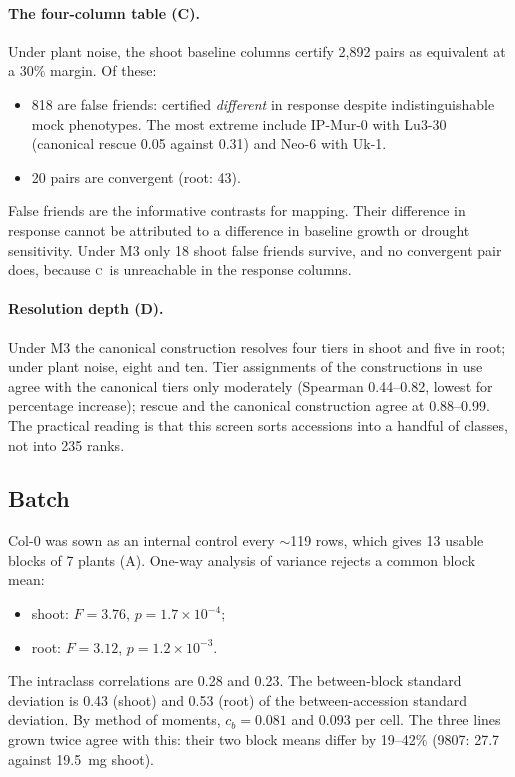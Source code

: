 \documentclass[10pt,twocolumn,a4paper]{article}
\theoremstyle{definition}
\theoremstyle{remark}
\newcommand{\CC}{\textsc{c}}
\begin{document}
\paragraph{The four-column table (C).} Under plant noise,
the shoot baseline columns certify 2,892 pairs as equivalent at a 30\%
margin. Of these:
\begin{itemize}[leftmargin=1.3em,itemsep=1pt]
  \item 818 are false friends: certified \emph{different} in response
  despite indistinguishable mock phenotypes. The most extreme include
  IP-Mur-0 with Lu3-30 (canonical rescue 0.05 against 0.31) and Neo-6
  with Uk-1.
  \item 20 pairs are convergent (root: 43).
\end{itemize}
False friends are the informative contrasts for mapping. Their
difference in response cannot be attributed to a difference in baseline
growth or drought sensitivity. Under M3 only 18 shoot false friends
survive, and no convergent pair does, because \CC\ is unreachable in the
response columns.

\paragraph{Resolution depth (D).} Under M3 the canonical
construction resolves four tiers in shoot and five in root; under plant
noise, eight and ten. Tier assignments of the constructions in use agree
with the canonical tiers only moderately (Spearman 0.44--0.82, lowest for
percentage increase); rescue and the canonical construction agree at
0.88--0.99. The practical reading is that this screen sorts
accessions into a handful of classes, not into 235 ranks.

\subsection{Batch}
\label{sec:res-batch}

Col-0 was sown as an internal control every $\sim$119 rows, which gives
13 usable blocks of 7 plants (A). One-way analysis of
variance rejects a common block mean:
\begin{itemize}[leftmargin=1.3em,itemsep=1pt]
  \item shoot: $F=3.76$, $p=1.7\times10^{-4}$;
  \item root: $F=3.12$, $p=1.2\times10^{-3}$.
\end{itemize}
The intraclass correlations \citep{shrout1979} are 0.28 and 0.23. The
between-block standard deviation is 0.43 (shoot) and 0.53 (root) of the
between-accession standard deviation. By method of moments,
$c_b=0.081$ and $0.093$ per cell. The three lines grown twice agree with
this: their two block means differ by 19--42\% (9807: 27.7 against
19.5~mg shoot).
\end{document}
